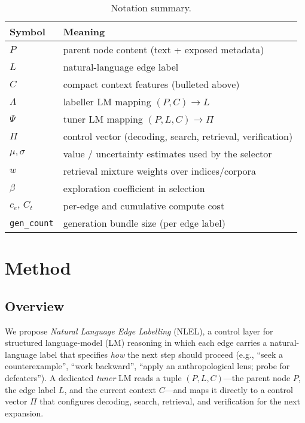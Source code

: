 \documentclass{article}
\theoremstyle{plain}
\theoremstyle{definition}
\theoremstyle{remark}
\begin{document}
\begin{table*}[h]
\begin{center}
\caption{Notation summary.}
\label{tab:notation}
\begin{tabular}{@{}ll@{}}
\toprule
Symbol & Meaning \\\midrule
$P$ & parent node content (text + exposed metadata) \\
$L$ & natural-language edge label \\
$C$ & compact context features (bulleted above) \\
$\Lambda$ & labeller LM mapping $(P,C)\!\to\!L$ \\
$\Psi$ & tuner LM mapping $(P,L,C)\!\to\!\Pi$ \\
$\Pi$ & control vector (decoding, search, retrieval, verification) \\
$\mu,\sigma$ & value / uncertainty estimates used by the selector \\
$w$ & retrieval mixture weights over indices/corpora \\
$\beta$ & exploration coefficient in selection \\
$c_e,\,C_t$ & per-edge and cumulative compute cost \\
\texttt{gen\_count} & generation bundle size (per edge label) \\
\bottomrule
\end{tabular}
\end{center}
\end{table*}

\section{Method}
\label{sec:method}

\subsection{Overview}
We propose \emph{Natural Language Edge Labelling} (NLEL), a control layer for structured language-model (LM) reasoning in which each edge carries a natural-language label that specifies \emph{how} the next step should proceed (e.g., ``seek a counterexample'', ``work backward'', ``apply an anthropological lens; probe for defeaters''). A dedicated \emph{tuner} LM reads a tuple $(P,L,C)$---the parent node $P$, the edge label $L$, and the current context $C$---and maps it directly to a control vector $\Pi$ that configures decoding, search, retrieval, and verification for the next expansion.
\end{document}
